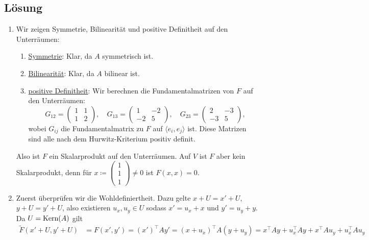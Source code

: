 \subsection{Lösung}
\begin{enumerate}
	\item Wir zeigen Symmetrie, Bilinearität und positive Definitheit auf den Unterräumen:
		\begin{enumerate}
		 	\item \underline{Symmetrie}: Klar, da \( A \) symmetrisch ist.
		 	\item \underline{Bilinearität}: Klar, da \( A \) bilinear ist.
		 	\item \underline{positive Definitheit}: Wir berechnen die Fundamentalmatrizen von \( F \) auf den Unterräumen:
		 		\begin{equation*}
		 			G_{12} = \begin{pmatrix}
		 				1 & 1 \\
		 				1 & 2
		 			\end{pmatrix}, \quad G_{13} = \begin{pmatrix}
		 				1 & -2 \\
		 				-2 & 5
		 			\end{pmatrix}, \quad G_{23} = \begin{pmatrix}
		 				2 & -3 \\
		 				-3 & 5
		 			\end{pmatrix}\text{,}
		 		\end{equation*}
		 		wobei \( G_{ij} \) die Fundamentalmatrix zu \( F \) auf \( \langle e_i, e_j \rangle \) ist. Diese Matrizen sind alle nach dem Hurwitz-Kriterium positiv definit.
		 \end{enumerate} 
		 Also ist \( F \) ein Skalarprodukt auf den Unterräumen. Auf \( V \) ist \( F \) aber kein Skalarprodukt, denn für \( x \coloneqq \left( \begin{smallmatrix}
		 	1 \\ 1 \\ 1
		 \end{smallmatrix} \right) \neq 0 \) ist \( F(x,x) = 0 \).
	\item Zuerst überprüfen wir die Wohldefiniertheit. Dazu gelte \( x+U = x'+U \), \( y+U = y'+U \), also existieren \( u_x, u_y \in U \) sodass \( x'=u_x+x \) und \( y' = u_y+y \). Da \( U = \text{Kern}(A) \) gilt
		\begin{align*}
			\widetilde{F}(x'+U, y'+U) &= F(x',y') = (x')^\top Ay' = (x+u_x)^\top A(y+u_y) = x^\top Ay + u_x^\top Ay + x^\top Au_y + u_x^\top Au_y \\

\end{align*}
\end{enumerate}
